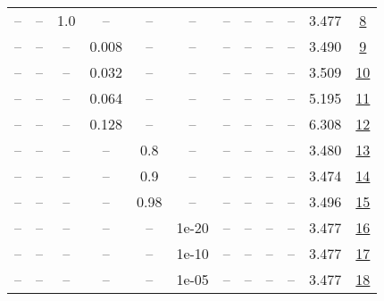 \begin{table}[H]
\begin{tabular}{cccccccccccc}
-- & -- & 1.0 & -- & -- & -- & -- & -- & -- & -- & 3.477 & \href{https://wandb.ai/stanford-mercury/optimizer-scaling/runs/sweep-130m-2B-sciond05cc9lr0.016-wd0.1-minlr0-warmup0-b10.95-gn1-e01433}{8} \\
-- & -- & -- & 0.008 & -- & -- & -- & -- & -- & -- & 3.490 & \href{https://wandb.ai/stanford-mercury/optimizer-scaling/runs/sweep-130m-2B-scion0c58eflr0.008-wd0.1-minlr0-warmup0-b10.95-gn1-649961}{9} \\
-- & -- & -- & 0.032 & -- & -- & -- & -- & -- & -- & 3.509 & \href{https://wandb.ai/stanford-mercury/optimizer-scaling/runs/sweep-130m-2B-scion96b754lr0.032-wd0.1-minlr0-warmup0-b10.95-gn1-c69eb3}{10} \\
-- & -- & -- & 0.064 & -- & -- & -- & -- & -- & -- & 5.195 & \href{https://wandb.ai/stanford-mercury/optimizer-scaling/runs/sweep-130m-2B-scion67b228lr0.064-wd0.1-minlr0-warmup0-b10.95-gn1-c13476}{11} \\
-- & -- & -- & 0.128 & -- & -- & -- & -- & -- & -- & 6.308 & \href{https://wandb.ai/stanford-mercury/optimizer-scaling/runs/sweep-130m-2B-scion8f1585lr0.128-wd0.1-minlr0-warmup0-b10.95-gn1-6644ed}{12} \\
-- & -- & -- & -- & 0.8 & -- & -- & -- & -- & -- & 3.480 & \href{https://wandb.ai/stanford-mercury/optimizer-scaling/runs/sweep-130m-2B-scion79fee1lr0.016-wd0.1-minlr0-warmup0-b10.95-gn1-b7e1e6}{13} \\
-- & -- & -- & -- & 0.9 & -- & -- & -- & -- & -- & 3.474 & \href{https://wandb.ai/stanford-mercury/optimizer-scaling/runs/sweep-130m-2B-scion5684eclr0.016-wd0.1-minlr0-warmup0-b10.95-gn1-1d55ac}{14} \\
-- & -- & -- & -- & 0.98 & -- & -- & -- & -- & -- & 3.496 & \href{https://wandb.ai/stanford-mercury/optimizer-scaling/runs/sweep-130m-2B-scion52669clr0.016-wd0.1-minlr0-warmup0-b10.95-gn1-0becd6}{15} \\
-- & -- & -- & -- & -- & 1e-20 & -- & -- & -- & -- & 3.477 & \href{https://wandb.ai/stanford-mercury/optimizer-scaling/runs/sweep-130m-2B-scion2b053alr0.016-wd0.1-minlr0-warmup0-b10.95-gn1-9c862f}{16} \\
-- & -- & -- & -- & -- & 1e-10 & -- & -- & -- & -- & 3.477 & \href{https://wandb.ai/stanford-mercury/optimizer-scaling/runs/sweep-130m-2B-scionbd616clr0.016-wd0.1-minlr0-warmup0-b10.95-gn1-ddb0e6}{17} \\
-- & -- & -- & -- & -- & 1e-05 & -- & -- & -- & -- & 3.477 & \href{https://wandb.ai/stanford-mercury/optimizer-scaling/runs/sweep-130m-2B-sciond84c90lr0.016-wd0.1-minlr0-warmup0-b10.95-gn1-3f4d04}{18} \\

\end{tabular}
\end{table}
